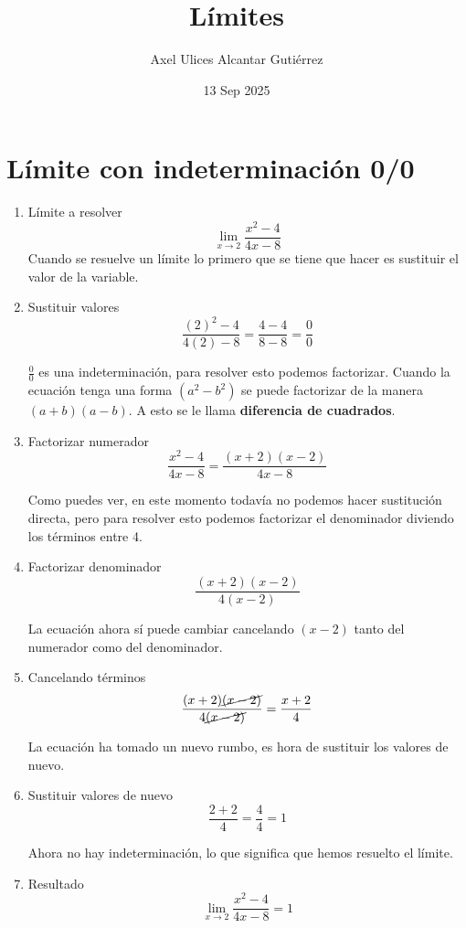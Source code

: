 \documentclass[a4paper,10pt]{article}
\title{Límites}
\author{Axel Ulices Alcantar Gutiérrez}
\date{13 Sep 2025}
\begin{document}
\maketitle

\section{Límite con indeterminación 0/0}

\begin{enumerate}
	\item Límite a resolver
	      $$\lim_{x\to2}\frac{x^{2} - 4}{4x - 8}$$
	      Cuando se resuelve un límite lo primero que se tiene que hacer es sustituir el valor de la variable.

	\item Sustituir valores
	      $$\frac{(2)^{2} - 4}{4(2) - 8} = \frac{4 - 4}{8 - 8} = \frac{0}{0}$$

	      $\frac{0}{0}$ es una indeterminación, para resolver esto podemos factorizar. Cuando la ecuación tenga una forma $(a^2 - b^2)$ se puede factorizar de la manera $(a + b)(a - b)$. A esto se le llama \textbf{diferencia de cuadrados}.

	\item Factorizar numerador
	      $$\frac{x^{2} - 4}{4x - 8} = \frac{(x + 2)(x - 2)}{4x - 8}$$

	      Como puedes ver, en este momento todavía no podemos hacer sustitución directa, pero para resolver esto podemos factorizar el denominador diviendo los términos entre 4.

	\item Factorizar denominador
	      $$\frac{(x + 2)(x - 2)}{4(x - 2)}$$

	      La ecuación ahora sí puede cambiar cancelando $(x - 2)$ tanto del numerador como del denominador.

	\item Cancelando términos
	      $$\frac{(x + 2)\cancel{(x - 2)}}{4\cancel{(x - 2)}} = \frac{x + 2}{4}$$

	      La ecuación ha tomado un nuevo rumbo, es hora de sustituir los valores de nuevo.

	\item Sustituir valores de nuevo
	      $$\frac{2 + 2}{4} = \frac{4}{4} = 1$$

        Ahora no hay indeterminación, lo que significa que hemos resuelto el límite.

	\item Resultado
	      $$\boxed{\lim_{x\to2}\frac{x^{2} - 4}{4x - 8} = 1}$$

\end{enumerate}
\end{document}

